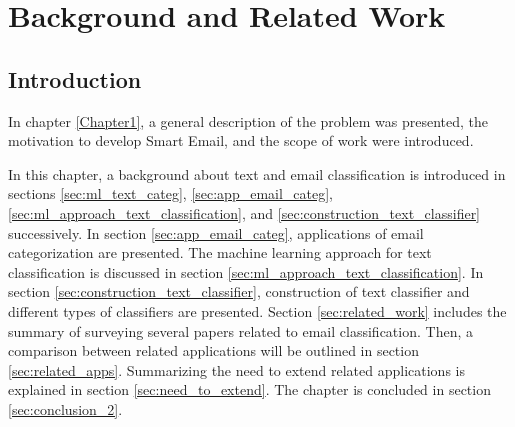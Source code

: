 


\newenvironment{my_itemize}
{\begin{itemize}
  \setlength{\itemsep}{0cm}
  \setlength{\parskip}{0cm}}
{\end{itemize}}
\newenvironment{my_enumerate}
{\begin{enumerate}
  \setlength{\itemsep}{0cm}
  \setlength{\parskip}{0cm}}
{\end{enumerate}}

\chapter{Background and Related Work} %

\label{Chapter2} %



\section{Introduction}
In chapter \ref{Chapter1}, a general description of the problem was presented, the motivation 
to develop Smart Email, and the scope of work were introduced.

In this chapter, a background about text and email classification is introduced in
sections \ref{sec:ml_text_categ}, \ref{sec:app_email_categ}, 
\ref{sec:ml_approach_text_classification}, and \ref{sec:construction_text_classifier} 
successively. In section \ref{sec:app_email_categ}, applications of email 
categorization are presented. The machine learning approach for text 
classification is discussed in section \ref{sec:ml_approach_text_classification}. 
In section \ref{sec:construction_text_classifier}, construction of text classifier 
and different types of classifiers are presented. Section \ref{sec:related_work} includes the summary of surveying several papers related to email classification. Then, a comparison
between related applications will be outlined in section \ref{sec:related_apps}. Summarizing the need to extend related applications is explained in section
\ref{sec:need_to_extend}. The chapter is concluded in section \ref{sec:conclusion_2}.


